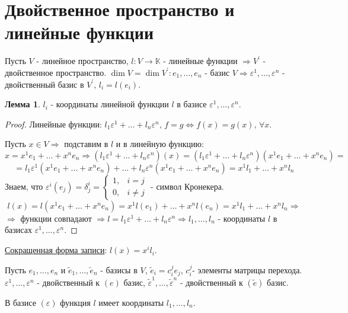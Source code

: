 \documentclass[12pt]{article}
\newcommand{\VE}{\varepsilon}
\theoremstyle{definition}
\newtheorem{lemma}{Лемма}
\begin{document}
\section*{Двойственное пространство и линейные функции}
Пусть $V$ - линейное пространство, $l \colon V \to \mathbb{K}$ - линейные функции $\Rightarrow V^\prime$ - двойственное пространство. $\dim{V} = \dim{V^\prime}\colon e_1,\dotsc, e_n$ - базис $V \Rightarrow \VE^1, \dotsc, \VE^n$ - двойственный базис в $V^\prime, \, l_i = l(e_i)$.

\begin{lemma}
	$l_i$ - координаты линейной функции $l$ в базисе $\VE^1,\dotsc, \VE^n$.
\end{lemma}
\begin{proof}
	Линейные функции: $l_1 \VE^1 + \dotsc + l_n \VE^n, \, f = g \Leftrightarrow f(x) = g(x), \, \forall x$.
	
	Пусть $x \in V \Rightarrow$ подставим в $l$ и в линейную функцию: 
	$$
		x = x^1 e_1 + \dotsc + x^n e_n \Rightarrow (l_1 \VE^1 + \dotsc + l_n \VE^n)(x) = (l_1 \VE^1 + \dotsc + l_n \VE^n)(x^1 e_1 + \dotsc + x^n e_n) = 
	$$
	$$	
		= l_1 \VE^1(x^1 e_1 + \dotsc + x^n e_n) + \dotsc + l_n \VE^n(x^1 e_1 + \dotsc + x^n e_n) = x^1 l_1 + \dotsc + x^n l_n
	$$
	Знаем, что  $\VE^i(e_j) = \delta_j^i = \begin{cases} 1, & i = j\\ 0, & i \neq j \end{cases}$ - символ Кронекера. 
	$$
		l(x) = l(x^1 e_1 + \dotsc + x^n e_n) = x^1 l(e_1) + \dotsc + x^n l(e_n) = x^1 l_1 + \dotsc + x^n l_n \Rightarrow
	$$ 
	$\Rightarrow$ функции совпадают $\Rightarrow l = l_1 \VE^1 + \dotsc + l_n \VE^n \Rightarrow l_1, \dotsc, l_n$ - координаты $l$ в базисах $\VE^1, \dotsc, \VE^n$.
\end{proof}

\uline{Сокращенная форма записи}: $l(x) = x^i l_i$.

Пусть $e_1,\dotsc, e_n$ и $\tilde{e}_1, \dotsc, \tilde{e}_n$ - базисы в $V$, $\tilde{e}_i = c_i^j e_j$, $c_i^j$- элементы матрицы перехода. $\VE^1,\dotsc,\VE^n$ - двойственный к $(e)$ базис, $\tilde{\VE}^1,\dotsc, \tilde{\VE}^n$ - двойственный к $(\tilde{e})$ базис.

В базисе $(\VE)$ функция $l$ имеет координаты $l_1,\dotsc, l_n$. 
\end{document}

